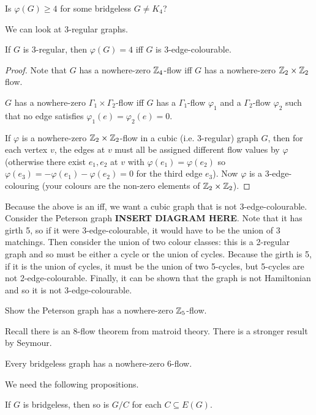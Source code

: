 \documentclass[main.tex]{subfiles}
\begin{document}
\begin{question*}
  Is $\varphi(G)\geq 4$ for some bridgeless $G\neq K_4$?
\end{question*}
We can look at 3-regular graphs.
\begin{proposition}
  If $G$ is 3-regular, then $\varphi(G) = 4$ iff $G$ is 3-edge-colourable.
\end{proposition}
\begin{proof}
  Note that $G$ has a nowhere-zero $\mathbb Z_4$-flow iff $G$ has a nowhere-zero
  $\mathbb Z_2\times\mathbb Z_2$ flow.
  \begin{proposition}
    $G$ has a nowhere-zero $\Gamma_1\times\Gamma_2$-flow iff $G$ has a
    $\Gamma_1$-flow $\varphi_1$ and a $\Gamma_2$-flow $\varphi_2$ such that
    no edge satisfies $\varphi_1(e) = \varphi_2(e) = 0$.
  \end{proposition}
  If $\varphi$ is a nowhere-zero $\mathbb Z_2\times\mathbb Z_2$-flow in a cubic (i.e. 3-regular)
  graph $G$, then for each vertex $v$, the edges at $v$ must all be assigned
  different flow values by $\varphi$ (otherwise there exist $e_1,e_2$ at $v$
  with $\varphi(e_1) = \varphi(e_2)$ so
  $\varphi(e_3) = -\varphi(e_1) - \varphi(e_2) = 0$ for the third edge $e_3$).
  Now $\varphi$ is a 3-edge-colouring (your colours are the non-zero elements
  of $\mathbb Z_2\times\mathbb Z_2$).
\end{proof}
Because the above is an iff, we want a cubic graph that is not 3-edge-colourable.
Consider the Peterson graph \textbf{INSERT DIAGRAM HERE}.
Note that it has girth 5, so if it were 3-edge-colourable, it would have to be
the union of 3 matchings.
Then consider the union of two colour classes: this is a 2-regular graph and so
must be either a cycle or the union of cycles.
Because the girth is 5, if it is the union of cycles, it must be the union of
two 5-cycles, but 5-cycles are not 2-edge-colourable.
Finally, it can be shown that the graph is not Hamiltonian and so it is not
3-edge-colourable.
\begin{exercise*}
  Show the Peterson graph has a nowhere-zero $\mathbb Z_5$-flow.
\end{exercise*}
Recall there is an 8-flow theorem from matroid theory.
There is a stronger result by Seymour.
\begin{theorem}[Seymour '81]
  Every bridgeless graph has a nowhere-zero 6-flow.
\end{theorem}
We need the following propositions.
\begin{proposition}
  If $G$ is bridgeless, then so is $G/C$ for each $C\subseteq E(G)$.
\end{proposition}
\end{document}
